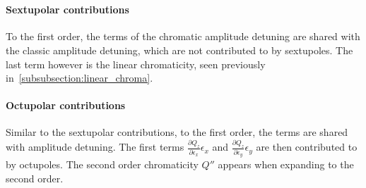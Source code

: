 \begin{equation}
\begin{aligned}
\end{aligned}
\label{eq:detuning_effects:chromatic_ampdet}
\end{equation}


\paragraph{Sextupolar contributions}

To the first order, the terms of the chromatic amplitude detuning are shared with the classic
amplitude detuning, which are not contributed to by sextupoles. 
The last term however is the linear chromaticity, seen previously in~\ref{subsubsection:linear_chroma}.


\paragraph{Octupolar contributions}

Similar to the sextupolar contributions, to the first order, the terms are shared with amplitude
detuning. The first terms $\frac{\partial Q_z}{\partial \epsilon_x}\epsilon_x$ and $\frac{\partial
Q_z}{\partial \epsilon_y}\epsilon_y$ are then contributed to by octupoles.
The second order chromaticity $Q''$ appears when expanding to the second order.



